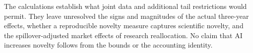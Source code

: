 \documentclass[11pt]{article}
\begin{document}
The calculations establish what joint data and additional tail restrictions would permit. They leave unresolved the signs and magnitudes of the actual three-year effects, whether a reproducible novelty measure captures scientific novelty, and the spillover-adjusted market effects of research reallocation. No claim that AI increases novelty follows from the bounds or the accounting identity.
\end{document}
